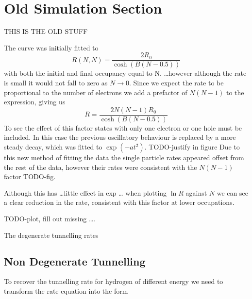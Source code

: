 \section{Old Simulation Section}

THIS IS THE OLD STUFF


The curve was initially fitted to
\begin{equation}
    R(N, N) = \frac{2R_0}{\cosh{(B(N - 0.5))}}
\end{equation}
with both the initial and final occupancy
equal to N. \ldots however although the rate is small it
would not fall to zero as \(N \rightarrow 0\).
Since we expect the rate to be proportional to the
number of electrons we add a prefactor of \(N(N-1)\)
to the expression, giving us
\begin{equation}
    R = \frac{2 N(N-1) R_0}{\cosh{(B(N - 0.5))}}
\end{equation}
To see the effect of this factor
states with only
one electron or one hole must be included.
In this
case the previous
oscillatory behaviour is replaced
by a more steady decay, which was fitted to
\(\exp{(-at^2)}\). TODO-justify in figure Due to this new
method of fitting the data the
single particle rates appeared
offset from the rest of the data,
however their rates were consistent
with the \(N(N-1)\) factor TODO-fig.

Although this has \ldots little effect in exp \ldots
when plotting \(\ln{R}\) against \(N\) we can see a
clear reduction in the rate, consistent with this factor
at lower occupations.

TODO-plot, fill out missing \ldots.

The degenerate tunnelling rates

\subsection{Non Degenerate Tunnelling}
To recover the tunnelling rate for hydrogen of different
energy we need to transform the rate equation
into the form


